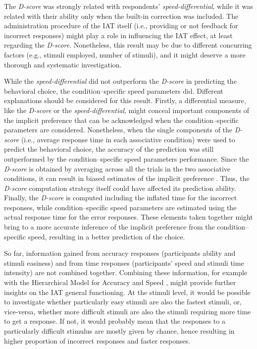 \documentclass[12pt]{book}
\begin{document}

The \emph{D-score} was strongly related with respondents' \emph{speed-differential}, while it was related with their ability only when the built-in correction was included. The administration procedure of the IAT itself (i.e., providing or not feedback for incorrect responses) might play a role in influencing the IAT effect, at least regarding the \emph{D-score}. Nonetheless, this result may be due to different concurring factors (e.g., stimuli employed, number of stimuli), and it might deserve a more thorough and systematic investigation.

While the \emph{speed-differential} did not outperform the \emph{D-score} in predicting the behavioral choice, the condition--specific speed parameters did. Different explanations should be considered for this result. Firstly, a differential measure, like the \emph{D-score} or the \emph{speed-differential}, might conceal important components of the implicit preference that can be acknowledged when the condition--specific parameters are considered. 
Nonetheless, when the single components of the \emph{D-score} (i.e., average response time in each associative condition) were used to predict the behavioral choice, the accuracy of the prediction was still outperformed by the condition--specific speed parameters performance.
Since the \emph{D-score} is obtained by averaging across all the trials in the two associative conditions, it can result in biased estimates of the implicit preference \cite{wols2017}. Thus, the \emph{D-score} computation strategy itself could have affected its prediction ability. Finally, the \emph{D-score} is computed including the inflated time for the incorrect responses, while condition--specific speed parameters are estimated using the actual response time for the error responses. These elements taken together might bring to a more accurate inference of the implicit preference from the condition--specific speed, resulting in a better prediction of the choice.

So far, information gained from accuracy responses (participants ability and stimuli easiness) and from time responses (participants' speed and stimuli time intensity) are not combined together. Combining these information, for example with the Hierarchical Model for Accuracy and Speed \cite{VanDerLinden2007}, might provide further insights on the IAT general functioning. 
At the stimuli level, it would be possible to investigate whether particularly easy stimuli are also the fastest stimuli, or, vice-versa, whether more difficult stimuli are also the stimuli requiring more time to get a response. If not, it would probably mean that the responses to a particularly difficult stimulus are mostly given by chance, hence resulting in higher proportion of incorrect responses and faster responses.
\end{document}
